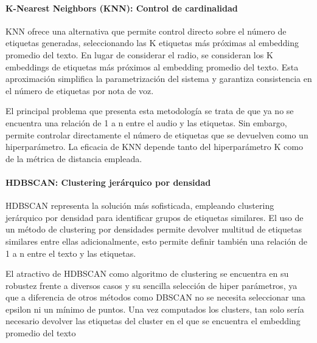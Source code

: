 \paragraph{K-Nearest Neighbors (KNN): Control de cardinalidad}

KNN ofrece una alternativa que permite control directo sobre el número de etiquetas generadas, seleccionando las K etiquetas más próximas al embedding promedio del texto. En lugar de considerar el radio, se consideran los K embeddings de etiquetas más próximos al embedding promedio del texto. Esta aproximación simplifica la parametrización del sistema y garantiza consistencia en el número de etiquetas por nota de voz.

El principal problema que presenta esta metodología se trata de que ya no se encuentra una relación de 1 a n entre el audio y las etiquetas. Sin embargo, permite controlar directamente el número de etiquetas que se devuelven como un hiperparámetro. La eficacia de KNN depende tanto del hiperparámetro K como de la métrica de distancia empleada.

\paragraph{HDBSCAN: Clustering jerárquico por densidad}

HDBSCAN representa la solución más sofisticada, empleando clustering jerárquico por densidad para identificar grupos de etiquetas similares. El uso de un método de clustering por densidades permite devolver multitud de etiquetas similares entre ellas adicionalmente, esto permite definir también una relación de 1 a n entre el texto y las etiquetas.

El atractivo de HDBSCAN como algoritmo de clustering se encuentra en su robustez frente a diversos casos y su sencilla selección de hiper parámetros, ya que a diferencia de otros métodos como DBSCAN no se necesita seleccionar una epsilon ni un mínimo de puntos. Una vez computados los clusters, tan solo sería necesario devolver las etiquetas del cluster en el que se encuentra el embedding promedio del texto
